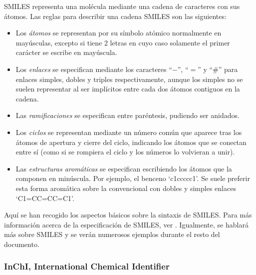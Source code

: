 SMILES representa una molécula mediante una cadena de caracteres con sus átomos. Las reglas para describir una cadena SMILES son las siguientes:
\begin{itemize}
    \item Los \textit{átomos} se representan por su símbolo atómico normalmente en mayúsculas, excepto si tiene 2 letras en cuyo caso solamente el primer carácter se escribe en mayúscula.
    \item Los \textit{enlaces} se especifican mediante los caracteres ``$-$'', ``$=$'' y ``\#'' para enlaces simples, dobles y triples respectivamente, aunque los simples no se suelen representar al ser implícitos entre cada dos átomos contiguos en la cadena.
    \item Las \textit{ramificaciones} se especifican entre paréntesis, pudiendo ser anidados.
    \item Los \textit{ciclos} se representan mediante un número común que aparece tras los átomos de apertura y cierre del ciclo, indicando los átomos que se conectan entre sí (como si se rompiera el ciclo y los números lo volvieran a unir).
    \item Las \textit{estructuras aromáticas} se especifican escribiendo los átomos que la componen en minúscula. Por ejemplo, el benceno `c1ccccc1'. Se suele preferir esta forma aromática sobre la convencional con dobles y simples enlaces `C1=CC=CC=C1'.
\end{itemize}

Aquí se han recogido los aspectos básicos sobre la sintaxis de SMILES. Para más información acerca de la especificación de SMILES, ver \cite{smiles_tuto, weininger_smiles_1988}. Igualmente, se hablará más sobre SMILES y se verán numerosos ejemplos durante el resto del documento.

\subsubsection{InChI, International Chemical Identifier}

